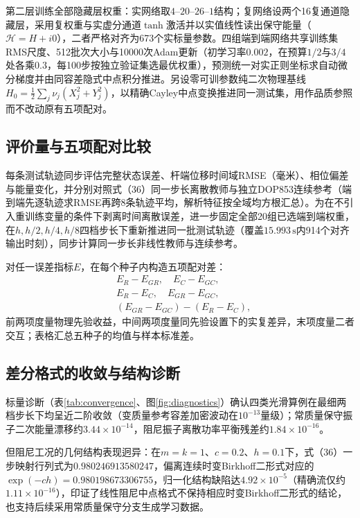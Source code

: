 第二层训练全部隐藏层权重：实网络取$4$--$20$--$26$--$1$结构；复网络设两个16复通道隐藏层，采用复权重与实虚分通道$\tanh$激活\citep{Trabelsi2018}并以实值线性读出保守能量（$\mathcal H=H+i0$），二者严格对齐为673个实标量参数。四组端到端网络共享训练集RMS尺度、512批次大小与10000次Adam更新（初学习率$0.002$，在预算$1/2$与$3/4$处各乘$0.3$，每100步按独立验证集选最优权重），预测统一对实正则坐标求自动微分梯度并由同容差隐式中点积分推进。另设零可训参数纯二次物理基线$H_0=\tfrac12\sum_j\nu_j(X_j^2+Y_j^2)$，以精确Cayley中点变换推进同一测试集，用作品质参照而不改动原有五项配对。

\subsection{评价量与五项配对比较}
每条测试轨迹同步评估完整状态误差、杆端位移时间域RMSE（毫米）、相位偏差与能量变化，并分别对照式（36）同一步长离散教师与独立DOP853连续参考（端到端先逐轨迹求RMSE再跨8条轨迹平均，解析特征按全域均方根汇总）。为在不引入重训练变量的条件下剥离时间离散误差，进一步固定全部20组已选端到端权重，在$h,h/2,h/4,h/8$四档步长下重新推进同一批测试轨迹（覆盖$15.993\,\mathrm s$内914个对齐输出时刻），同步计算同一步长非线性教师与连续参考。

对任一误差指标$E$，在每个种子内构造五项配对差：
\begin{align}
 &E_R-E_{GR},\quad E_C-E_{GC},\nonumber\\
 &E_R-E_C,\quad E_{GR}-E_{GC},\nonumber\\
 &(E_{GR}-E_{GC})-(E_R-E_C),
 \label{eq:five-contrasts}
\end{align}
前两项度量物理先验收益，中间两项度量同先验设置下的实复差异，末项度量二者交互；表格汇总五种子的均值与样本标准差。

\subsection{差分格式的收敛与结构诊断}
标量诊断（表\ref{tab:convergence}、图\ref{fig:diagnostics}）确认四类光滑算例在最细两档步长下均呈近二阶收敛（变质量参考容差加密波动在$10^{-13}$量级）；常质量保守振子二次能量漂移约$3.44\times10^{-14}$，阻尼振子离散功率平衡残差约$1.84\times10^{-16}$。

但阻尼工况的几何结构表现迥异：在$m=k=1$、$c=0.2$、$h=0.1$下，式（36）一步映射行列式为$0.980246913580247$，偏离连续时变Birkhoff二形式对应的$\exp(-ch)=0.980198673306755$，归一化结构缺陷达$4.92\times10^{-5}$（精确流仅约$1.11\times10^{-16}$），印证了线性阻尼中点格式不保持相应时变Birkhoff二形式的结论\citep[第15章，第630页，式(5.4)]{FengQin2010}，也支持后续采用常质量保守分支生成学习数据。

